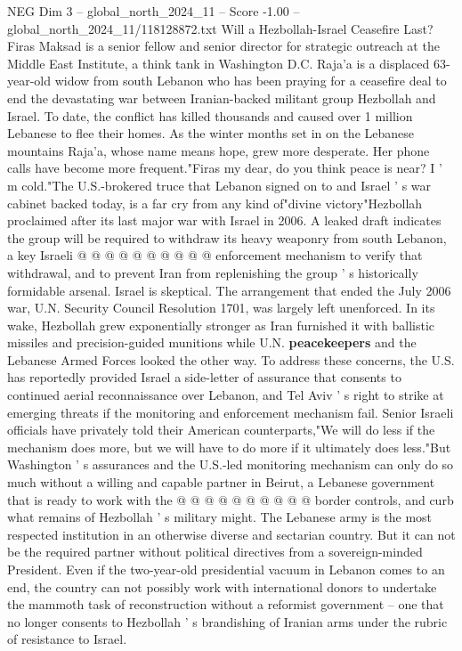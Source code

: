 \begin{textsample}{NEG Dim 3 – global\_north\_2024\_11 – Score -1.00 – global\_north\_2024\_11/118128872.txt}  \label{ex:f3_neg_283}
Will a Hezbollah-Israel Ceasefire Last?
Firas Maksad is a senior fellow and senior director for strategic outreach at the Middle East Institute, a think tank in Washington D.C.
Raja'a is a displaced 63-year-old widow from south Lebanon who has been praying for a ceasefire deal to end the devastating war between Iranian-backed militant group Hezbollah and Israel.
To date, the conflict has killed thousands and caused over 1 million Lebanese to flee their homes.
As the winter months set in on the Lebanese mountains Raja'a, whose name means hope, grew more desperate.
Her phone calls have become more frequent."Firas my dear, do you think peace is near?
I ' m cold."The U.S.-brokered truce that Lebanon signed on to and Israel ' s war cabinet backed today, is a far cry from any kind of"divine victory"Hezbollah proclaimed after its last major war with Israel in 2006.
A leaked draft indicates the group will be required to withdraw its heavy weaponry from south Lebanon, a key Israeli @ @ @ @ @ @ @ @ @ @ enforcement mechanism to verify that withdrawal, and to prevent Iran from replenishing the group ' s historically formidable arsenal.
Israel is skeptical.
The arrangement that ended the July 2006 war, U.N.
Security Council Resolution 1701, was largely left unenforced.
In its wake, Hezbollah grew exponentially stronger as Iran furnished it with ballistic missiles and precision-guided munitions while U.N. \textbf{peacekeepers} and the Lebanese Armed Forces looked the other way.
To address these concerns, the U.S. has reportedly provided Israel a side-letter of assurance that consents to continued aerial reconnaissance over Lebanon, and Tel Aviv ' s right to strike at emerging threats if the monitoring and enforcement mechanism fail.
Senior Israeli officials have privately told their American counterparts,"We will do less if the mechanism does more, but we will have to do more if it ultimately does less."But Washington ' s assurances and the U.S.-led monitoring mechanism can only do so much without a willing and capable partner in Beirut, a Lebanese government that is ready to work with the @ @ @ @ @ @ @ @ @ @ border controls, and curb what remains of Hezbollah ' s military might.
The Lebanese army is the most respected institution in an otherwise diverse and sectarian country.
But it can not be the required partner without political directives from a sovereign-minded President.
Even if the two-year-old presidential vacuum in Lebanon comes to an end, the country can not possibly work with international donors to undertake the mammoth task of reconstruction without a reformist government -- one that no longer consents to Hezbollah ' s brandishing of Iranian arms under the rubric of resistance to Israel.

\end{textsample}
